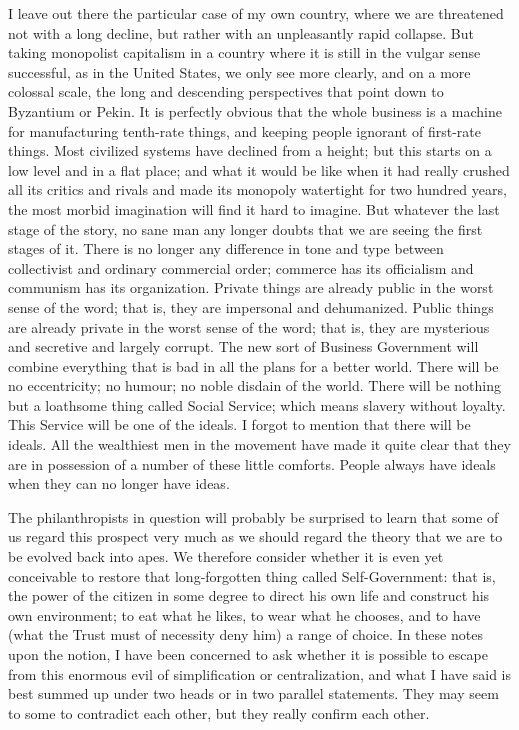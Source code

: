 \documentclass{book}
\begin{document}
I leave out there the particular case of my own country, where we are threatened not with a long decline, but rather with an unpleasantly rapid collapse. But taking monopolist capitalism in a country where it is still in the vulgar sense successful, as in the United States, we only see more clearly, and on a more colossal scale, the long and descending perspectives that point down to Byzantium or Pekin. It is perfectly obvious that the whole business is a machine for manufacturing tenth-rate things, and keeping people ignorant of first-rate things. Most civilized systems have declined from a height; but this starts on a low level and in a flat place; and what it would be like when it had really crushed all its critics and rivals and made its monopoly watertight for two hundred years, the most morbid imagination will find it hard to imagine. But whatever the last stage of the story, no sane man any longer doubts that we are seeing the first stages of it. There is no longer any difference in tone and type between collectivist and ordinary commercial order; commerce has its officialism and communism has its organization. Private things are already public in the worst sense of the word; that is, they are impersonal and dehumanized. Public things are already private in the worst sense of the word; that is, they are mysterious and secretive and largely corrupt. The new sort of Business Government will combine everything that is bad in all the plans for a better world. There will be no eccentricity; no humour; no noble disdain of the world. There will be nothing but a loathsome thing called Social Service; which means slavery without loyalty. This Service will be one of the ideals. I forgot to mention that there will be ideals. All the wealthiest men in the movement have made it quite clear that they are in possession of a number of these little comforts. People always have ideals when they can no longer have ideas.

The philanthropists in question will probably be surprised to learn that some of us regard this prospect very much as we should regard the theory that we are to be evolved back into apes. We therefore consider whether it is even yet conceivable to restore that long-forgotten thing called Self-Government: that is, the power of the citizen in some degree to direct his own life and construct his own environment; to eat what he likes, to wear what he chooses, and to have (what the Trust must of necessity deny him) a range of choice. In these notes upon the notion, I have been concerned to ask whether it is possible to escape from this enormous evil of simplification or centralization, and what I have said is best summed up under two heads or in two parallel statements. They may seem to some to contradict each other, but they really confirm each other.
\end{document}
